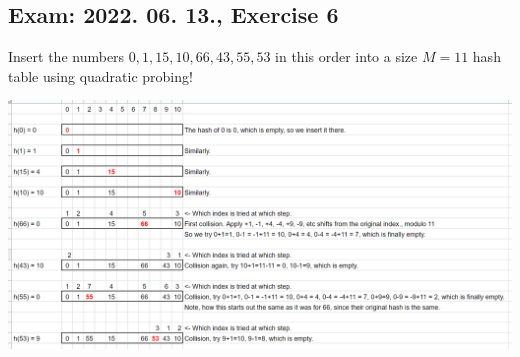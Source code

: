 \subsection{Exam: 2022. 06. 13., Exercise 6}


Insert the numbers $0, 1, 15, 10, 66, 43, 55, 53$ in this order into a size $M=11$ hash table using quadratic probing!


\begin{center}
    \includegraphics[width=\linewidth]{exams/2022_06_13/06/hash_quadratic.png}
\end{center}